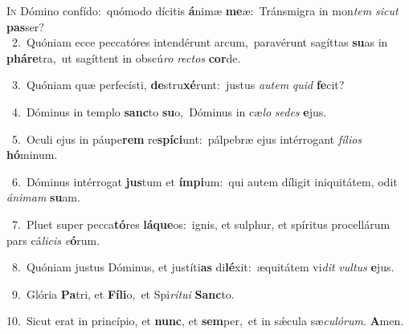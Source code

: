 \lettrine{\initial\textcolor{\initialcolor}{I}}{n} Dómino confído:~\dagger quómodo dícitis \textbf{á}\-nimæ \textbf{me}\-æ:~\star Tránsmigra in mon\textit{tem} \textit{sic}\-\textit{ut} \textbf{pas}\-ser?\\
{\numbfont\textcolor{\numbcolor}{~2.}}~Quóniam ecce peccatóres intendérunt arcum,~\dagger paravérunt sagíttas \textbf{su}\-as in \textbf{phá}\-\textbf{re}tra,~\star ut sagíttent in obscú\textit{ro} \textit{rec}\-\textit{tos} \textbf{cor}\-de.\par
{\numbfont\textcolor{\numbcolor}{~3.}}~Quóniam quæ perfecísti, \textbf{de}\-stru\-\textbf{xé}\-runt:~\star justus \textit{au}\-\textit{tem} \textit{quid} \textbf{fe}\-cit?\par
{\numbfont\textcolor{\numbcolor}{~4.}}~Dóminus in templo \textbf{sanc}\-to \textbf{su}\-o,~\star Dóminus in cæ\textit{lo} \textit{se}\-\textit{des} \textbf{e}\-jus.\par
{\numbfont\textcolor{\numbcolor}{~5.}}~Oculi ejus in páupe\textbf{rem} re\-\textbf{spí}\-\textbf{ci}unt:~\star pálpebræ ejus intérrogant \textit{fí}\-\textit{li}\textit{os} \textbf{hó}\-minum.\par
{\numbfont\textcolor{\numbcolor}{~6.}}~Dóminus intérrogat \textbf{jus}\-tum et \textbf{ím}\-\textbf{pi}um:~\star qui autem díligit iniquitátem, odit \textit{á}\-\textit{ni}\textit{mam} \textbf{su}\-am.\par
{\numbfont\textcolor{\numbcolor}{~7.}}~Pluet super pecca\-\textbf{tó}\-res \textbf{lá}\-\textbf{que}os:~\star ignis, et sulphur, et spíritus procellárum pars cá\-\textit{li}\-\textit{cis} \textit{e}\-\textbf{ó}rum.\par
{\numbfont\textcolor{\numbcolor}{~8.}}~Quóniam justus Dóminus, et justíti\textbf{as} di\-\textbf{lé}\-xit:~\star æquitátem vi\textit{dit} \textit{vul}\-\textit{tus} \textbf{e}\-jus.\par
{\numbfont\textcolor{\numbcolor}{~9.}}~Glória \textbf{Pa}\-tri, et \textbf{Fí}\-\textbf{li}o,~\star et Spi\-\textit{rí}\-\textit{tu}\textit{i} \textbf{Sanc}\-to.\par
{\numbfont\textcolor{\numbcolor}{10.}}~Sicut erat in princípio, et \textbf{nunc}\-, et \textbf{sem}\-per,~\star et in sǽcula sæ\-\textit{cu}\-\textit{ló}\textit{rum}. \textbf{A}\-men.\par

